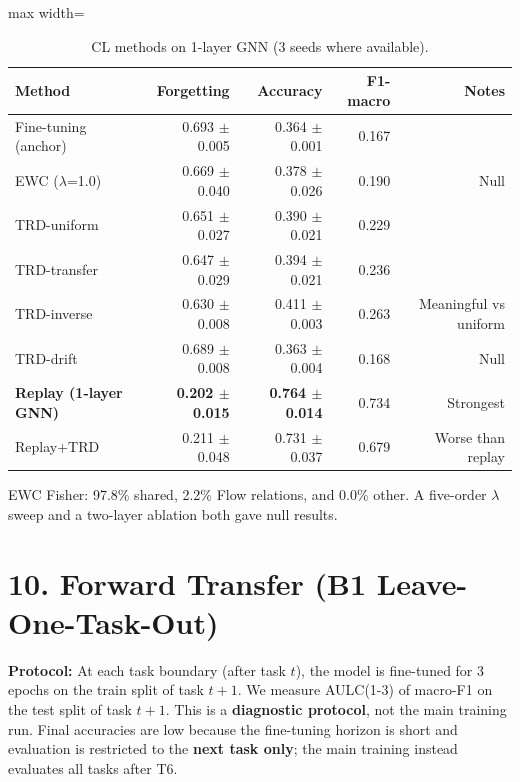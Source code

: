\documentclass[11pt,a4paper]{article}
\begin{document}
\begin{table}[H]
\centering
\caption{CL methods on 1-layer GNN (3 seeds where available).}
\label{tab:method-comparison}
\begin{adjustbox}{max width=\textwidth}
\begin{tabular}{lrrrr}
\toprule
Method & Forgetting & Accuracy & F1-macro & Notes \\
\midrule
Fine-tuning (anchor) & 0.693 $\pm$ 0.005 & 0.364 $\pm$ 0.001 & 0.167 & \\
EWC ($\lambda$=1.0) & 0.669 $\pm$ 0.040 & 0.378 $\pm$ 0.026 & 0.190 & Null \\
TRD-uniform & 0.651 $\pm$ 0.027 & 0.390 $\pm$ 0.021 & 0.229 & \\
TRD-transfer & 0.647 $\pm$ 0.029 & 0.394 $\pm$ 0.021 & 0.236 & \\
TRD-inverse & 0.630 $\pm$ 0.008 & 0.411 $\pm$ 0.003 & 0.263 & Meaningful vs uniform \\
TRD-drift & 0.689 $\pm$ 0.008 & 0.363 $\pm$ 0.004 & 0.168 & Null \\
\textbf{Replay (1-layer GNN)} & \textbf{0.202 $\pm$ 0.015} & \textbf{0.764 $\pm$ 0.014} & 0.734 & Strongest \\
Replay+TRD & 0.211 $\pm$ 0.048 & 0.731 $\pm$ 0.037 & 0.679 & Worse than replay \\
\bottomrule
\end{tabular}
\end{adjustbox}
\end{table}

EWC Fisher: 97.8\% shared, 2.2\% Flow relations, and 0.0\% other. A five-order $\lambda$ sweep and a two-layer ablation both gave null results.

\section*{10. Forward Transfer (B1 Leave-One-Task-Out)}
\textbf{Protocol:} At each task boundary (after task $t$), the model is fine-tuned for 3 epochs on the train split of task $t+1$. We measure AULC(1-3) of macro-F1 on the test split of task $t+1$. This is a \textbf{diagnostic protocol}, not the main training run. Final accuracies are low because the fine-tuning horizon is short and evaluation is restricted to the \textbf{next task only}; the main training instead evaluates all tasks after T6.
\end{document}
